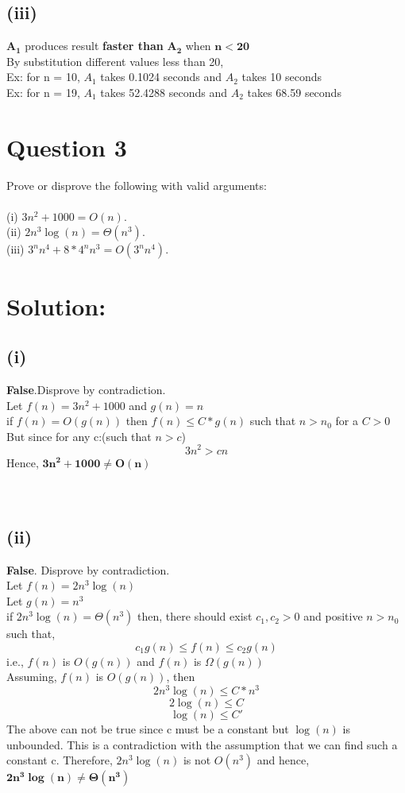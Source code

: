 \documentclass[12pt, a4paper]{article}
\begin{document}
\subsection*{(iii)} $\bm{ A_1}$ produces result \textbf{faster than} $\bm{ A_2}$ when $\bm{ n < 20}$
\\By substitution different values less than 20, \\Ex: for n = 10, $A_1$ takes 0.1024 seconds and $A_2$ takes 10 seconds\\Ex: for n = 19, $A_1$ takes 52.4288 seconds and $A_2$ takes 68.59 seconds
\section*{Question 3}
 Prove or disprove the following with valid arguments:\\\\(i) $3n^{2}+ 1000 =O(n)$.
\\(ii) $2n^{3}\log ({n}) = \Theta(n^{3})$.
\\(iii) $3^{n}n^{4}+ 8 * 4^{n}n^{3}=O(3^{n}n^{4})$.
\section*{Solution:}
\subsection*{(i)} \textbf{False}.Disprove by contradiction.\\ Let $f(n) = 3n^{2} + 1000$ and $g(n) = n$ \\ if $f(n) = O(g(n))$ then $f(n) \leq C * g(n)$ such that $n>n_0$ for a $C>0$
	\\But since for any c:(such that $n>c$)$$3n^{2} > cn$$  Hence, $\bm{3n^{2} + 1000 \neq O(n)}$\\\\\\
\subsection*{(ii)} \textbf{False}. Disprove by contradiction.
\\Let $f(n) = 2n^{3} \log (n)$ \\ Let $g(n) = n^{3}$
\\ if $2n^{3}\log ({n}) = \Theta(n^{3})$ then, there should exist $c_1, c_2 >0$ and positive $n>n_0$ such that, $$ c_1 g(n) \leq f(n) \leq c_2 g(n) $$ i.e., $f(n)$ is $O(g(n))$ and $f(n)$ is $\Omega(g(n))$
\\Assuming, $f(n)$ is $O(g(n))$, then $$2n^{3} \log (n) \leq C * n^{3}$$ $$2 \log (n) \leq C $$ $$\log (n) \leq C' $$ The above can not be true since c must be a constant but $\log (n)$ is unbounded. This is a contradiction with the assumption that we can find such a constant c. Therefore, $2n^{3}\log ({n})$ is not $O(n^{3})$ and hence, $\bm{2n^{3}\log ({n}) \neq \Theta(n^{3})}$
\end{document}
